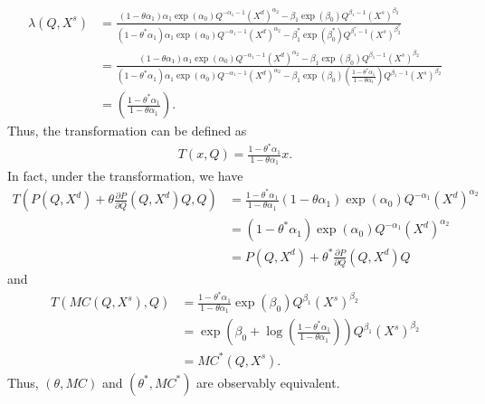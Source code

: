 \documentclass[11pt, a4paper]{article}
\theoremstyle{remark}
\begin{document}
\begin{align}
    \lambda(Q, X^{s}) & = \frac{(1 -\theta\alpha_1)\alpha_1 \exp(\alpha_0) Q^{-\alpha_1 - 1}(X^{d})^{\alpha_2} - \beta_1 \exp(\beta_0)Q^{\beta_1-1} (X^{s})^{\beta_2}}{(1 -\theta^{*}\alpha_1)\alpha_1 \exp(\alpha_0) Q^{-\alpha_1 - 1}(X^{d})^{\alpha_2} - \beta_1^{*} \exp(\beta_0^{*})Q^{\beta_1^{*}-1} (X^{s})^{\beta_2^{*}}} \\
    & = \frac{(1 -\theta\alpha_1)\alpha_1 \exp(\alpha_0) Q^{-\alpha_1 - 1}(X^{d})^{\alpha_2} - \beta_1 \exp(\beta_0)Q^{\beta_1-1} (X^{s})^{\beta_2}}{(1 -\theta^{*}\alpha_1)\alpha_1 \exp(\alpha_0) Q^{-\alpha_1 - 1}(X^{d})^{\alpha_2} - \beta_1 \exp(\beta_0)\left(\frac{1-\theta^*\alpha_1}{1 - \theta\alpha_1}\right)   Q^{\beta_1-1} (X^{s})^{\beta_2}} \\
    & = \left(\frac{1-\theta^*\alpha_1}{1 - \theta\alpha_1}\right).
\end{align}
Thus, the transformation can be defined as
\begin{align}
    T(x, Q) = \frac{1 - \theta^* \alpha_1}{1 - \theta \alpha_1}x.
\end{align}
In fact, under the transformation, we have
\begin{align}
    T\left(P(Q, X^{d}) + \theta \frac{\partial P}{\partial Q}(Q, X^{d}) Q, Q\right)
    &= \frac{1 - \theta^*\alpha_1}{1- \theta\alpha_1} (1 - \theta\alpha_1)\exp(\alpha_0) Q^{-\alpha_1} (X^{d})^{\alpha_2}\\
    & = (1 - \theta^{*}\alpha_1)\exp(\alpha_0) Q^{-\alpha_1} (X^{d})^{\alpha_2}\\
    &= P(Q, X^{d}) + \theta^{*} \frac{\partial P}{\partial Q}(Q, X^{d}) Q
\end{align}
and
\begin{align}
    T\left(MC(Q, X^{s}), Q\right) &= \frac{1 - \theta^*\alpha_1}{1- \theta\alpha_1}\exp(\beta_0) Q^{\beta_1} (X^{s})^{\beta_2}\\
    &= \exp\left(\beta_0 + \log\left(\frac{1 - \theta^*\alpha_1}{1- \theta\alpha_1}\right)\right) Q^{\beta_1} (X^{s})^{\beta_2}\\
    &= MC^{*}(Q, X^{s}).
\end{align}
Thus, $(\theta, MC)$ and $(\theta^{*}, MC^{*})$ are observably equivalent.
\end{document}
